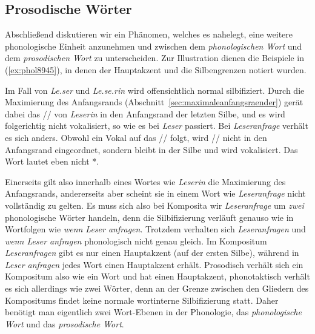 \subsection{Prosodische Wörter}

\label{sec:prosodischewoerter}

Abschließend diskutieren wir ein Phänomen, welches es nahelegt, eine weitere phonologische Einheit anzunehmen und zwischen dem \textit{phonologischen Wort} und dem \textit{prosodischen Wort} zu unterscheiden.
Zur Illustration dienen die Beispiele in (\ref{ex:phol8945}), in denen der Hauptakzent und die Silbengrenzen notiert wurden.

\begin{exe}
  \ex\label{ex:phol8945}
  \begin{xlist}
  \end{xlist}
\end{exe}

Im Fall von \textit{Le.ser} und \textit{Le.se.rin} wird offensichtlich normal silbifiziert.
Durch die Maximierung des Anfangsrands (Abschnitt~\ref{sec:maximaleanfangsraender}) gerät dabei das // von \textit{Leserin} in den Anfangsrand der letzten Silbe, und es wird folgerichtig nicht vokalisiert, so wie es bei \textit{Leser} passiert.
Bei \textit{Leseranfrage} verhält es sich anders.
Obwohl ein Vokal auf das // folgt, wird // nicht in den Anfangsrand eingeordnet, sondern bleibt in der Silbe \textipa{[z5]} und wird vokalisiert.
Das Wort lautet eben nicht *.

Einerseits gilt also innerhalb eines Wortes wie \textit{Leserin} die Maximierung des Anfangsrands, andererseits aber scheint sie in einem Wort wie \textit{Leseranfrage} nicht vollständig zu gelten.
Es muss sich also bei Komposita wir \textit{Leseranfrage} um \textit{zwei} phonologische Wörter handeln, denn die Silbifizierung verläuft genauso wie in Wortfolgen wie \textit{wenn Leser anfragen}.
Trotzdem verhalten sich \textit{Leseranfragen} und \textit{wenn Leser anfragen} phonologisch nicht genau gleich.
Im Kompositum \textit{Leseranfragen} gibt es nur einen Hauptakzent (auf der ersten Silbe), während in \textit{Leser anfragen} jedes Wort einen Hauptakzent erhält.
Prosodisch verhält sich ein Kompositum also wie ein Wort und hat einen Hauptakzent, phonotaktisch verhält es sich allerdings wie zwei Wörter, denn an der Grenze zwischen den Gliedern des Kompositums findet keine normale wortinterne Silbifizierung statt.
Daher benötigt man eigentlich zwei Wort-Ebenen in der Phonologie, das \textit{phonologische Wort} und das \textit{prosodische Wort}.

